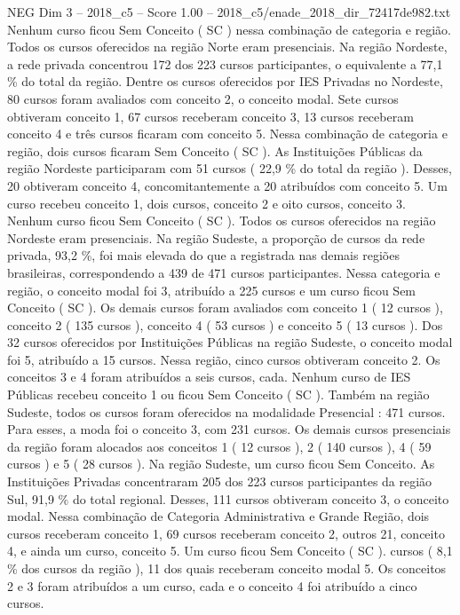 \begin{textsample}{NEG Dim 3 – 2018\_c5 – Score 1.00 – 2018\_c5/enade\_2018\_dir\_72417de982.txt}
Nenhum curso ficou Sem Conceito ( SC ) nessa combinação de categoria e região.
Todos os cursos oferecidos na região Norte eram presenciais.
Na região Nordeste, a rede privada concentrou 172 dos 223 cursos participantes, o equivalente a 77,1 \% do total da região.
Dentre os cursos oferecidos por IES Privadas no Nordeste, 80 cursos foram avaliados com conceito 2, o conceito modal.
Sete cursos obtiveram conceito 1, 67 cursos receberam conceito 3, 13 cursos receberam conceito 4 e três cursos ficaram com conceito 5.
Nessa combinação de categoria e região, dois cursos ficaram Sem Conceito ( SC ).
As Instituições Públicas da região Nordeste participaram com 51 cursos ( 22,9 \% do total da região ).
Desses, 20 obtiveram conceito 4, concomitantemente a 20 atribuídos com conceito 5.
Um curso recebeu conceito 1, dois cursos, conceito 2 e oito cursos, conceito 3.
Nenhum curso ficou Sem Conceito ( SC ).
Todos os cursos oferecidos na região Nordeste eram presenciais.
Na região Sudeste, a proporção de cursos da rede privada, 93,2 \%, foi mais elevada do que a registrada nas demais regiões brasileiras, correspondendo a 439 de 471 cursos participantes.
Nessa categoria e região, o conceito modal foi 3, atribuído a 225 cursos e um curso ficou Sem Conceito ( SC ).
Os demais cursos foram avaliados com conceito 1 ( 12 cursos ), conceito 2 ( 135 cursos ), conceito 4 ( 53 cursos ) e conceito 5 ( 13 cursos ).
Dos 32 cursos oferecidos por Instituições Públicas na região Sudeste, o conceito modal foi 5, atribuído a 15 cursos.
Nessa região, cinco cursos obtiveram conceito 2.
Os conceitos 3 e 4 foram atribuídos a seis cursos, cada.
Nenhum curso de IES Públicas recebeu conceito 1 ou ficou Sem Conceito ( SC ).
Também na região Sudeste, todos os cursos foram oferecidos na modalidade Presencial : 471 cursos.
Para esses, a moda foi o conceito 3, com 231 cursos.
Os demais cursos presenciais da região foram alocados aos conceitos 1 ( 12 cursos ), 2 ( 140 cursos ), 4 ( 59 cursos ) e 5 ( 28 cursos ).
Na região Sudeste, um curso ficou Sem Conceito.
As Instituições Privadas concentraram 205 dos 223 cursos participantes da região Sul, 91,9 \% do total regional.
Desses, 111 cursos obtiveram conceito 3, o conceito modal.
Nessa combinação de Categoria Administrativa e Grande Região, dois cursos receberam conceito 1, 69 cursos receberam conceito 2, outros 21, conceito 4, e ainda um curso, conceito 5.
Um curso ficou Sem Conceito ( SC ). cursos ( 8,1 \% dos cursos da região ), 11 dos quais receberam conceito modal 5.
Os conceitos 2 e 3 foram atribuídos a um curso, cada e o conceito 4 foi atribuído a cinco cursos.

\end{textsample}
